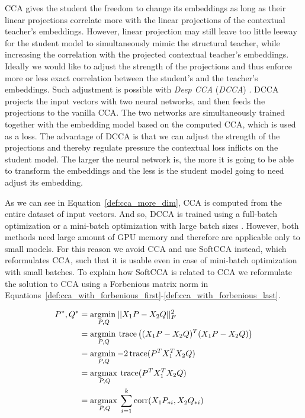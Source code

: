 CCA gives the student the freedom to change its embeddings as long as their
linear projections correlate more with the linear projections of the contextual
teacher's embeddings. However, linear projection may still leave too little
leeway for the student model to simultaneously mimic the structural teacher,
while increasing the correlation with the projected contextual teacher's
embeddings. Ideally we would like to adjust the strength of the projections and
thus enforce more or less exact correlation between the student's and the
teacher's embeddings. Such adjustment is possible with \emph{Deep CCA}
(\emph{DCCA}) \citep{andrew2013deep}. DCCA projects the input vectors with two
neural networks, and then feeds the projections to the vanilla CCA. The two
networks are simultaneously trained together with the embedding model based on
the computed CCA, which is used as a loss. The advantage of DCCA is that we can
adjust the strength of the projections and thereby regulate pressure the
contextual loss inflicts on the student model. The larger the neural network
is, the more it is going to be able to transform the embeddings and the less is
the student model going to need adjust its embedding.

As we can see in Equation~\ref{def:cca_more_dim}, CCA is computed from the
entire dataset of input vectors. And so, DCCA is trained using a full-batch
optimization \citep{andrew2013deep} or a mini-batch optimization with large
batch sizes \citep{wang2015unsupervised}. However, both methods need large
amount of GPU memory and therefore are applicable only to small models. For
this reason we avoid CCA and use SoftCCA \citep{chang2018scalable} instead,
which reformulates CCA, such that it is usable even in case of mini-batch
optimization with small batches. To explain how SoftCCA is related to CCA we
reformulate the solution to CCA using a Forbenious matrix norm in
Equations~\ref{def:cca_with_forbenious_first}-\ref{def:cca_with_forbenious_last}.

\begin{align}
  P^\ast, Q^\ast &= \underset{P, Q}{\operatorname*{\arg\!\min\medspace}} ||X_1P - X_2Q||^2_F \label{def:cca_with_forbenious_first} \\
  &= \underset{P, Q}{\operatorname*{\arg\!\min\medspace}} \operatorname*{trace}\left((X_1P - X_2Q)^T(X_1P - X_2Q)\right) \\
  &= \underset{P, Q}{\operatorname*{\arg\!\min\medspace}} {-2} \operatorname*{trace}(P^TX_1^TX_2Q) \\
  &= \underset{P, Q}{\operatorname*{\arg\!\max\medspace}} \operatorname*{trace}(P^TX_1^TX_2Q) \\
  &= \underset{P, Q}{\operatorname*{\arg\!\max\medspace}} \sum_{i = 1}^k \operatorname*{corr}(X_1P_{*i}, X_2Q_{*i}) \label{def:cca_with_forbenious_last}
\end{align}

